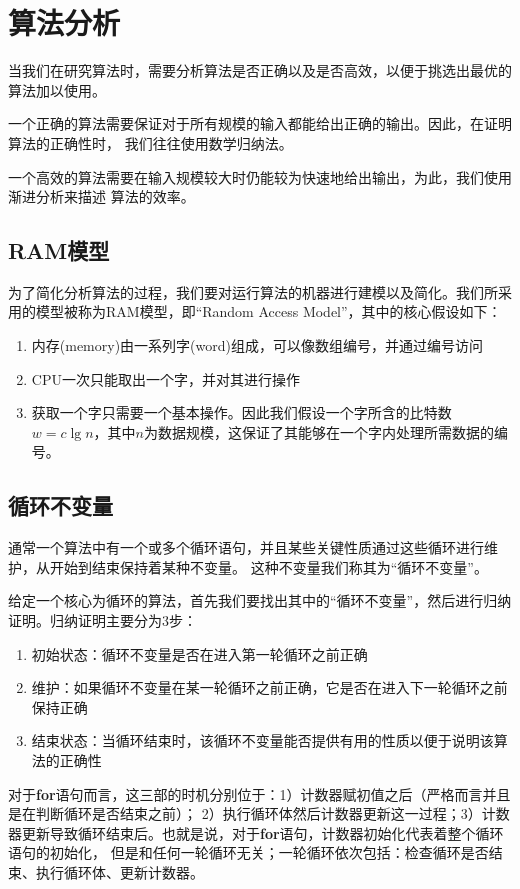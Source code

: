 \chapter{算法分析}
当我们在研究算法时，需要分析算法是否正确以及是否高效，以便于挑选出最优的算法加以使用。

一个正确的算法需要保证对于所有规模的输入都能给出正确的输出。因此，在证明算法的正确性时，
我们往往使用数学归纳法。

一个高效的算法需要在输入规模较大时仍能较为快速地给出输出，为此，我们使用渐进分析来描述
算法的效率。
\section{RAM模型}
为了简化分析算法的过程，我们要对运行算法的机器进行建模以及简化。我们所采用的模型被称为RAM模型，即“Random Access Model”，其中的核心假设如下：
\begin{enumerate}
    \item 内存(memory)由一系列字(word)组成，可以像数组编号，并通过编号访问
    \item CPU一次只能取出一个字，并对其进行操作
    \item 获取一个字只需要一个基本操作。因此我们假设一个字所含的比特数$w=c\lg n$，其中$n$为数据规模，这保证了其能够在一个字内处理所需数据的编号。
\end{enumerate}
\section{循环不变量}
通常一个算法中有一个或多个循环语句，并且某些关键性质通过这些循环进行维护，从开始到结束保持着某种不变量。
这种不变量我们称其为“循环不变量”。

给定一个核心为循环的算法，首先我们要找出其中的“循环不变量”，然后进行归纳证明。归纳证明主要分为3步：
\begin{enumerate}
    \item {\cuhei 初始状态：}循环不变量是否在进入第一轮循环之前正确
    \item {\cuhei 维护：}如果循环不变量在某一轮循环之前正确，它是否在进入下一轮循环之前保持正确
    \item {\cuhei 结束状态：}当循环结束时，该循环不变量能否提供有用的性质以便于说明该算法的正确性
\end{enumerate}
对于{\code\bfseries for}语句而言，这三部的时机分别位于：1）计数器赋初值之后（严格而言并且是在判断循环是否结束之前）；
2）执行循环体然后计数器更新这一过程；3）计数器更新导致循环结束后。也就是说，对于{\code\bfseries for}语句，计数器初始化代表着整个循环语句的初始化，
但是和任何一轮循环无关；一轮循环依次包括：检查循环是否结束、执行循环体、更新计数器。

